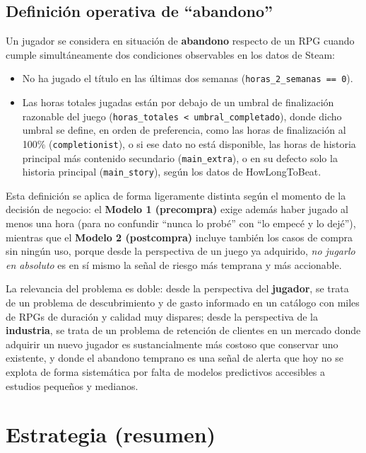 \documentclass[11pt,letterpaper]{article}
\newcommand{\code}[1]{\texttt{\small #1}}
\begin{document}
\subsection{Definición operativa de ``abandono''}

Un jugador se considera en situación de \textbf{abandono} respecto de un RPG cuando cumple simultáneamente dos condiciones observables en los datos de Steam:

\begin{itemize}
  \item No ha jugado el título en las últimas dos semanas (\code{horas\_2\_semanas == 0}).
  \item Las horas totales jugadas están por debajo de un umbral de finalización razonable del juego (\code{horas\_totales < umbral\_completado}), donde dicho umbral se define, en orden de preferencia, como las horas de finalización al 100\% (\code{completionist}), o si ese dato no está disponible, las horas de historia principal más contenido secundario (\code{main\_extra}), o en su defecto solo la historia principal (\code{main\_story}), según los datos de HowLongToBeat.
\end{itemize}

Esta definición se aplica de forma ligeramente distinta según el momento de la decisión de negocio: el \textbf{Modelo 1 (precompra)} exige además haber jugado al menos una hora (para no confundir ``nunca lo probé'' con ``lo empecé y lo dejé''), mientras que el \textbf{Modelo 2 (postcompra)} incluye también los casos de compra sin ningún uso, porque desde la perspectiva de un juego ya adquirido, \emph{no jugarlo en absoluto} es en sí mismo la señal de riesgo más temprana y más accionable.

La relevancia del problema es doble: desde la perspectiva del \textbf{jugador}, se trata de un problema de descubrimiento y de gasto informado en un catálogo con miles de RPGs de duración y calidad muy dispares; desde la perspectiva de la \textbf{industria}, se trata de un problema de retención de clientes en un mercado donde adquirir un nuevo jugador es sustancialmente más costoso que conservar uno existente, y donde el abandono temprano es una señal de alerta que hoy no se explota de forma sistemática por falta de modelos predictivos accesibles a estudios pequeños y medianos.

\section{Estrategia (resumen)}
\end{document}
